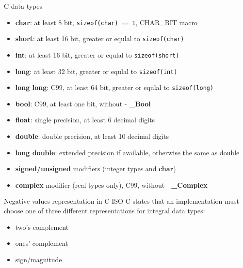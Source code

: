 \begin{frame}{C data types}
    \begin{itemize}
        \item \textbf{char}: at least 8 bit, \texttt{sizeof(char) == 1}, CHAR\_BIT macro
        \item \textbf{short}: at least 16 bit, greater or equlal to \texttt{sizeof(char)}
        \item \textbf{int}: at least 16 bit, greater or equlal to \texttt{sizeof(short)}
        \item \textbf{long}: at least 32 bit, greater or equlal to \texttt{sizeof(int)}
        \item \textbf{long long}: C99, at least 64 bit, greater or equlal to \texttt{sizeof(long)}
        \item \textbf{bool}: C99, at least one bit, without  - \textbf{\_Bool}
        \item \textbf{float}: single precision, at least 6 decimal digits
        \item \textbf{double}: double precision, at least 10 decimal digits
        \item \textbf{long double}: extended precision if available, otherwise the same as double
        \item \textbf{signed/unsigned} modifiers (integer types and \textbf{char})
        \item \textbf{complex} modifier (real types only), C99, without  - \textbf{\_Complex}
    \end{itemize}
\end{frame}
\begin{frame}{Negative values representation in C}
ISO C states that an implementation must choose one of three different representations for integral data types:
    \begin{itemize}
        \item two's complement
        \item ones' complement
        \item sign/magnitude
    \end{itemize}
\end{frame}
